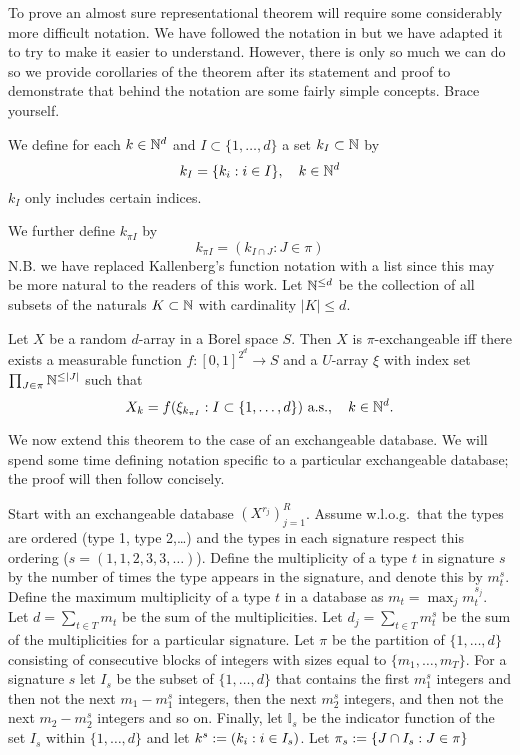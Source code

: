 To prove an almost sure representational theorem will require some considerably more difficult notation.
We have followed the notation in  but we have adapted it to try to make it easier to understand.
However, there is only so much we can do so we provide corollaries of the theorem after its statement and proof to demonstrate that behind the notation are some fairly simple concepts.
Brace yourself.

We define for each $k \in \mathbb{N}^d$ and $I \subset \{1,\ldots,d\}$ a set $k_I \subset \mathbb{N}$ by
\begin{equation}
k_I = \{k_i: i \in I\}, \quad k \in \mathbb{N}^d
\end{equation}
\ie $k_I$ only includes certain indices.

We further define $k_{\pi I}$ by
\begin{equation}
  k_{\pi I} = (k_{I \cap J} : J \in \pi)
\end{equation}
N.B. we have replaced Kallenberg's function notation with a list since this may be more natural to the readers of this work.
Let $\mathbb{N}^{\leq d}$ be the collection of all subsets of the naturals $K \subset \mathbb{N}$ with cardinality $|K| \leq d$.

\begin{prop}
\label{prop:piexas}
  Let $X$ be a random $d$-array in a Borel space $S$.
  Then $X$ is $\pi$-exchangeable iff there exists a measurable function $f:[0,1]^{2^d}\to S$ and a $U$-array $\xi$ with index set $\prod_{J\in\pi} \mathbb{N}^{\leq |J|}$ such that
  \begin{equation}
    X_k = f(\xi_{k_{\pi I}} : I \subset \{1,\ldots,d\}) \ \textrm{a.s.}, \quad k \in \mathbb{N}^d.
    \label{eq:piexas}
  \end{equation}
\end{prop}

We now extend this theorem to the case of an exchangeable database.
We will spend some time defining notation specific to a particular exchangeable database; the proof will then follow concisely.

Start with an exchangeable database $(X^{r_j})_{j=1}^R$.
Assume w.l.o.g.\ that the types are ordered (\eg type 1, type 2,\dots) and the types in each signature respect this ordering (\eg $s = (1,1,2,3,3,\dots)$).
Define the multiplicity of a type $t$ in signature $s$ by the number of times the type appears in the signature, and denote this by $m_{t}^s$.
Define the maximum multiplicity of a type $t$ in a database as $m_t = \max_j m_t^{s_j}$.
Let $d = \sum_{t\in T} m_t$ be the sum of the multiplicities.
Let $d_j = \sum_{t\in T} m_t^s$ be the sum of the multiplicities for a particular signature.
Let $\pi$ be the partition of $\{1,\ldots,d\}$ consisting of consecutive blocks of integers with sizes equal to $\{m_1,\ldots,m_T\}$.
For a signature $s$ let $I_s$ be the subset of $\{1,\ldots,d\}$ that contains the first $m_1^s$ integers and then not the next $m_1 - m_1^s$ integers, then the next $m_2^s$ integers, and then not the next $m_2 - m_2^s$ integers and so on.
Finally, let $\mathbb{I}_s$ be the indicator function of the set $I_s$ within $\{1,\ldots,d\}$ and let $k^s := (k_i : i \in I_s)$.
Let $\pi_s := \{J \cap I_s : J \in \pi\}$


